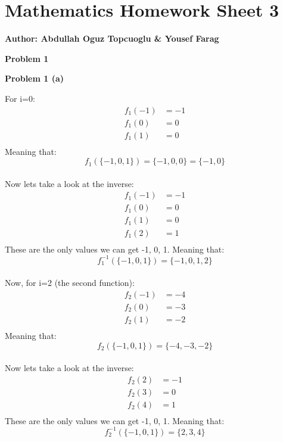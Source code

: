 \documentclass{article}
\begin{document}
\section*{\huge Mathematics Homework Sheet 3}
\begin{flushright}
   \textbf{Author: Abdullah Oguz Topcuoglu \& Yousef Farag}
\end{flushright}

\begin{flushleft}
   \textbf{\Large Problem 1}
\end{flushleft}

\begin{flushleft}
   \textbf{\Large Problem 1 (a)}
\end{flushleft}

For i=0:
\begin{align*}
   f_1(-1) &= -1 \\
   f_1(0)  &= 0 \\
   f_1(1)  &= 0 \\
\end{align*}
Meaning that:
\[
   f_1(\{-1, 0, 1\}) = \{-1, 0, 0\} = \{-1, 0\}
\]
\\
Now lets take a look at the inverse:
\begin{align*}
   f_1(-1) &= -1 \\
   f_1(0)  &= 0 \\
   f_1(1)  &= 0 \\
   f_1(2)  &= 1 \\
\end{align*}
These are the only values we can get -1, 0, 1. Meaning that:
\[
   f_1^{-1}(\{-1, 0, 1\}) = \{-1, 0, 1, 2\}
\]
\\
Now, for i=2 (the second function):
\begin{align*}
   f_2(-1) &= -4 \\
   f_2(0)  &= -3 \\
   f_2(1)  &= -2 \\
\end{align*}
Meaning that:
\[
   f_2(\{-1, 0, 1\}) = \{-4, -3, -2\}
\]
\\
Now lets take a look at the inverse:
\begin{align*}
   f_2(2) &= -1 \\
   f_2(3) &= 0 \\
   f_2(4) &= 1 \\
\end{align*}
These are the only values we can get -1, 0, 1. Meaning that:
\[
   f_2^{-1}(\{-1, 0, 1\}) = \{2, 3, 4\}
\]
\\
\end{document}
